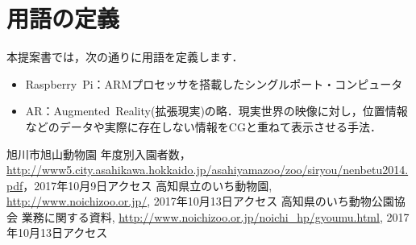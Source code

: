\documentclass[a4j]{jarticle}
\begin{document}
\section{用語の定義}
  本提案書では，次の通りに用語を定義します．
\begin{itemize}
\item Raspberry~Pi：ARMプロセッサを搭載したシングルポート・コンピュータ
\item AR：Augmented~Reality(拡張現実)の略．現実世界の映像に対し，位置情報などのデータや実際に存在しない情報をCGと重ねて表示させる手法．
\end{itemize}


\begin{thebibliography}{9}
旭川市旭山動物園 年度別入園者数，\url{http://www5.city.asahikawa.hokkaido.jp/asahiyamazoo/zoo/siryou/nenbetu2014.pdf}，2017年10月9日アクセス
高知県立のいち動物園, \url{http://www.noichizoo.or.jp/}, 2017年10月13日アクセス  
  高知県のいち動物公園協会 業務に関する資料, \url{http://www.noichizoo.or.jp/noichi_hp/gyoumu.html}, 2017年10月13日アクセス

\end{thebibliography}
\end{document}
